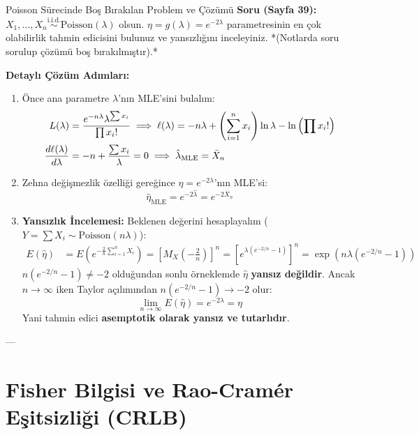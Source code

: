 \documentclass[12pt,a4paper]{article}
\begin{document}
\begin{odev}{Poisson Sürecinde Boş Bırakılan Problem ve Çözümü}
\textbf{Soru (Sayfa 39):} $X_1, \dots, X_n \overset{\text{i.i.d.}}{\sim} \text{Poisson}(\lambda)$ olsun. $\eta = g(\lambda) = e^{-2\lambda}$ parametresinin en çok olabilirlik tahmin edicisini bulunuz ve yansızlığını inceleyiniz. *(Notlarda soru sorulup çözümü boş bırakılmıştır).*

\bigskip
\textbf{Detaylı Çözüm Adımları:}
\begin{enumerate}
    \item Önce ana parametre $\lambda$'nın MLE'sini bulalım:
    \begin{align}
        L(\lambda) &= \frac{e^{-n\lambda} \lambda^{\sum x_i}}{\prod x_i!} \implies \ell(\lambda) = -n\lambda + \left(\sum_{i=1}^n x_i\right) \ln\lambda - \ln\left(\prod x_i!\right) \notag \\
        \frac{d\ell(\lambda)}{d\lambda} &= -n + \frac{\sum x_i}{\lambda} = 0 \implies \hat{\lambda}_{\text{MLE}} = \bar{X}_n
    \end{align}
    \item Zehna değişmezlik özelliği gereğince $\eta = e^{-2\lambda}$'nın MLE'si:
    \begin{equation}
        \boxed{\hat{\eta}_{\text{MLE}} = e^{-2\hat{\lambda}} = e^{-2\bar{X}_n}}
    \end{equation}
    \item \textbf{Yansızlık İncelemesi:}  
    Beklenen değerini hesaplayalım ($Y = \sum X_i \sim \text{Poisson}(n\lambda)$):
    \begin{align}
        E(\hat{\eta}) &= E\left( e^{-\frac{2}{n}\sum_{i=1}^n X_i} \right) = \left[ M_X\left(-\frac{2}{n}\right) \right]^n = \left[ e^{\lambda(e^{-2/n} - 1)} \right]^n = \exp\left( n\lambda(e^{-2/n} - 1) \right)
    \end{align}
    $n(e^{-2/n} - 1) \neq -2$ olduğundan sonlu örneklemde $\hat{\eta}$ \textbf{yansız değildir}.  
    Ancak $n \to \infty$ iken Taylor açılımından $n(e^{-2/n} - 1) \to -2$ olur:
    \begin{equation}
        \lim_{n \to \infty} E(\hat{\eta}) = e^{-2\lambda} = \eta
    \end{equation}
    Yani tahmin edici \textbf{asemptotik olarak yansız ve tutarlıdır}.
\end{enumerate}
\end{odev}

---

\section{Fisher Bilgisi ve Rao-Cramér Eşitsizliği (CRLB)}
\end{document}
